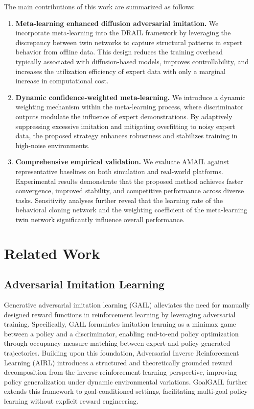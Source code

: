 \documentclass[lettersize,journal]{IEEEtran}
\begin{document}
The main contributions of this work are summarized as follows:

\begin{enumerate}
\item[1)] \textbf{Meta-learning enhanced diffusion adversarial imitation.} We incorporate meta-learning into the DRAIL framework by leveraging the discrepancy between twin networks to capture structural patterns in expert behavior from offline data. This design reduces the training overhead typically associated with diffusion-based models, improves controllability, and increases the utilization efficiency of expert data with only a marginal increase in computational cost.
\item[2)] \textbf{Dynamic confidence-weighted meta-learning.} We introduce a dynamic weighting mechanism within the meta-learning process, where discriminator outputs modulate the influence of expert demonstrations. By adaptively suppressing excessive imitation and mitigating overfitting to noisy expert data, the proposed strategy enhances robustness and stabilizes training in high-noise environments.
\item[3)] \textbf{Comprehensive empirical validation.} We evaluate AMAIL against representative baselines on both simulation and real-world platforms. Experimental results demonstrate that the proposed method achieves faster convergence, improved stability, and competitive performance across diverse tasks. Sensitivity analyses further reveal that the learning rate of the behavioral cloning network and the weighting coefficient of the meta-learning twin network significantly influence overall performance.
\end{enumerate}


\section{Related Work}
\subsection{Adversarial Imitation Learning}
Generative adversarial imitation learning (GAIL) alleviates the need for manually designed reward functions in reinforcement learning by leveraging adversarial training. Specifically, GAIL formulates imitation learning as a minimax game between a policy and a discriminator, enabling end-to-end policy optimization through occupancy measure matching between expert and policy-generated trajectories. Building upon this foundation, Adversarial Inverse Reinforcement Learning (AIRL) introduces a structured and theoretically grounded reward decomposition from the inverse reinforcement learning perspective, improving policy generalization under dynamic environmental variations. GoalGAIL further extends this framework to goal-conditioned settings, facilitating multi-goal policy learning without explicit reward engineering.
\end{document}
